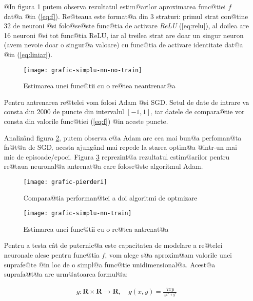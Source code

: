 @In figura \ref{fig:grafic-simplu-nn-no-train} putem observa rezultatul estim@arilor aproximarea func@tiei $f$ dat@a @in (\ref{eq:f}). Re@teaua este format@a din 3 straturi: primul strat con@tine 32 de neuroni @si folo@se@ste func@tia de activare \textsl{ReLU} (\ref{eq:relu}), al doilea are 16 neuroni @si tot func@tia ReLU, iar al treilea strat are doar un singur neuron (avem nevoie doar o singur@a valoare) cu func@tia de activare identitate dat@a @in (\ref{eq:liniar}).

\begin{figure}[h]
	\centering
	\texttt{[image: grafic-simplu-nn-no-train]}
	\caption{Estimarea unei func@tii cu o re@tea neantrenat@a}
	\label{fig:grafic-simplu-nn-no-train}
\end{figure}

Pentru antrenarea re@telei vom folosi Adam @si SGD. Setul de date de intrare va consta din 2000 de puncte din intervalul $[-1, 1]$, iar datele de compara@tie vor consta din valorile func@tiei (\ref{eq:f}) @in aceste puncte.

Analiz\^ and figura \ref{fig:grafic-pierderi}, putem observa c@a Adam are cea mai bun@a perfoman@ta fa@t@a de SGD, acesta ajung\^ and mai repede la starea optim@a @intr-un mai mic de episoade/epoci. Figura \ref{fig:grafic-simplu-nn-train} reprezint@a rezultatul estim@arilor pentru re@taua neuronal@a antrenat@a care folose@ste algoritmul Adam.
 
\begin{figure}[H]
	\centering
	\texttt{[image: grafic-pierderi]}
	\caption{Compara@tia performan@tei a doi algoritmi de optmizare}
	\label{fig:grafic-pierderi}
\end{figure}

\begin{figure}[H]
	\centering
	\texttt{[image: grafic-simplu-nn-train]}
	\caption{Estimarea unei func@tii cu o re@tea antrenat@a}
	\label{fig:grafic-simplu-nn-train}
\end{figure}

Pentru a testa c\^ at de puternic@a este capacitatea de modelare a re@telei neuronale alese pentru func@tia $f$, vom alege s@a aproxim@am valorile unei suprafe@te @in loc de o simpl@a func@tie unidimensional@a. Acest@a suprafa@t@a are urm@atoarea formul@a:

\begin{align} \label{eq:suprafata}
	g: \mathbf{R} \times \mathbf{R} \to \mathbf{R}, \quad
	g(x, y) = \displaystyle\frac{7xy}{e^{x^2 + y^2}}
\end{align} 

